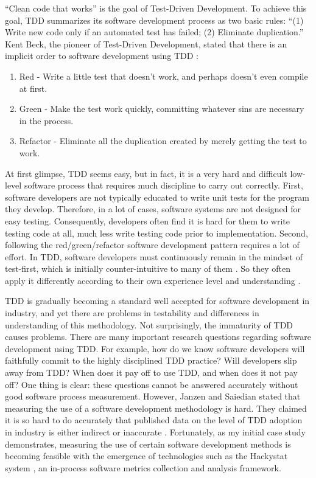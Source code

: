 ``Clean code that works''\cite{Beck:03} is the goal of Test-Driven
Development. To achieve this goal, TDD summarizes its software development
process as two basic rules: ``(1) Write new code only if an automated test
has failed; (2) Eliminate duplication.''  Kent Beck, the pioneer of
Test-Driven Development, stated that there is an implicit order to software
development using TDD \cite{Beck:03}: 
\begin{enumerate}
\item Red - Write a little test that doesn't work, and perhaps doesn't even
  compile at first.
\item Green - Make the test work quickly, committing whatever sins are
  necessary in the process.  
\item Refactor - Eliminate all the duplication created by merely getting
  the test to work.  
\end{enumerate}
At first glimpse, TDD seems easy, but in fact, it is a very hard and
difficult low-level software process that requires much discipline to 
carry out correctly. First, software developers are not typically educated 
to write unit tests for the program they develop. Therefore,
in a lot of cases, software systems are not designed for easy testing.
Consequently, developers often find it is hard for them to write testing
code at all, much less write testing code prior to implementation. Second,
following the red/green/refactor software development pattern requires a
lot of effort. In TDD, software developers must continuously remain in the
mindset of test-first, which is initially counter-intuitive to many of them
\cite{Beck:01,Wang:04}. So they often apply it differently according to
their own experience level and understanding \cite{Beck:01}.

TDD is gradually becoming a standard well accepted for software development in industry,
and yet there are problems in testability and differences in understanding
of this methodology. Not surprisingly, the immaturity of TDD causes problems. 
There are many important research questions regarding software development using 
TDD. For example, how do we know software developers will faithfully commit
to the highly disciplined TDD practice? Will developers slip away from TDD?
When does it pay off to use TDD, and when does it not pay off? One thing is
clear: these questions cannot be answered accurately without good software
process measurement. However, Janzen and Saiedian \cite{Janzen:05} stated
that measuring the use of a software development methodology is hard. They
claimed it is so hard to do accurately that published data on the level of
TDD adoption in industry is either indirect or inaccurate \cite{Janzen:05,
  UnitTestingPoll:06}.  Fortunately, as my initial case study demonstrates,
measuring the use of certain software development methods is becoming
feasible with the emergence of technologies such as the Hackystat system
\cite{Hackystat:06,csdl2-04-11,csdl2-04-22,csdl2-03-12}, an in-process
software metrics collection and analysis framework.

